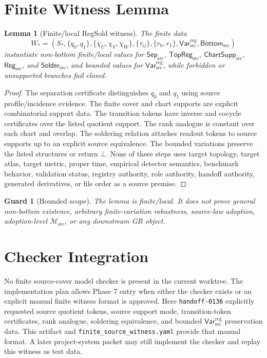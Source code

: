 \documentclass[11pt]{article}
\newcommand{\Msrc}{\mathcal{M}_{\mathrm{src}}}
\newcommand{\SepSrc}{\mathsf{Sep}_{\mathrm{src}}}
\newcommand{\TopRegSrc}{\mathsf{TopReg}_{\mathrm{src}}}
\newcommand{\ChartSuppSrc}{\mathsf{ChartSupp}_{\mathrm{src}}}
\newcommand{\RegSrc}{\mathsf{Reg}_{\mathrm{src}}}
\newcommand{\SolderSrc}{\mathsf{Solder}_{\mathrm{src}}}
\newcommand{\VarRegSrc}{\mathsf{Var}^{\mathrm{reg}}_{\mathrm{src}}}
\newcommand{\BottomSrc}{\mathsf{Bottom}_{\mathrm{src}}}
\newcommand{\Bot}{\bot}
\newtheorem{lemma}{Lemma}
\newtheorem{guard}{Guard}
\begin{document}
\section{Finite Witness Lemma}

\begin{lemma}[Finite/local RegSold witness]
The finite data
\[
W_*=(S_*,\{q_0,q_1\},\{\chi_U,\chi_V,\chi_W\},
\{\tau_{ij}\},\{r_0,r_1\},\VarRegSrc,\BottomSrc)
\]
instantiate non-bottom finite/local values for \(\SepSrc\), \(\TopRegSrc\),
\(\ChartSuppSrc\), \(\RegSrc\), and \(\SolderSrc\), and bounded values for
\(\VarRegSrc\), while forbidden or unsupported branches fail closed.
\end{lemma}

\begin{proof}
The separation certificate distinguishes \(q_0\) and \(q_1\) using source
profile/incidence evidence. The finite cover and chart supports are explicit
combinatorial support data. The transition tokens have inverse and cocycle
certificates over the listed quotient support. The rank analogue is constant
over each chart and overlap. The soldering relation attaches readout tokens
to source supports up to an explicit source equivalence. The bounded
variations preserve the listed structures or return \(\Bot\). None of these
steps uses target topology, target atlas, target metric, proper time,
empirical detector semantics, benchmark behavior, validation status, registry
authority, role authority, handoff authority, generated derivatives, or file
order as a source premise.
\end{proof}

\begin{guard}[Bounded scope]
The lemma is finite/local. It does not prove general non-bottom existence,
arbitrary finite-variation robustness, source-law adoption, adoption-level
\(\Msrc\), or any downstream GR object.
\end{guard}

\section{Checker Integration}

No finite source-cover model checker is present in the current worktree.
The implementation plan allows Phase 7 entry when either the checker exists
or an explicit manual finite witness format is approved. Here
\texttt{handoff-0136} explicitly requested source quotient tokens, source
support mode, transition-token certificates, rank analogue, soldering
equivalence, and bounded \(\VarRegSrc\) preservation data. This artifact and
\texttt{finite\_source\_witness.yaml} provide that manual format. A later
project-system packet may still implement the checker and replay this witness
as test data.
\end{document}
